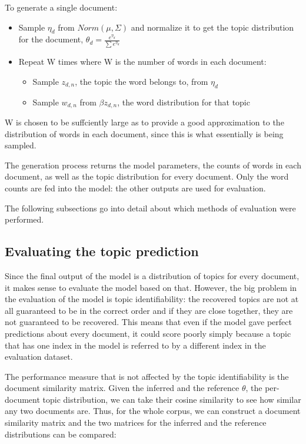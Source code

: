 \documentclass[12pt,a4paper,twoside,openright]{report}
\begin{document}
To generate a single document:

\begin{itemize}[noitemsep]
\item Sample $\eta_d$ from $Norm(\mu, \Sigma)$ and normalize it to get the topic distribution for the document, $\theta_d = \frac{e^{\eta_d}}{\sum{e^{\eta_d}}}$
\item Repeat W times where W is the number of words in each document:
\begin{itemize}[noitemsep]
\item Sample $z_{d, n}$, the topic the word belongs to, from $\eta_d$
\item Sample $w_{d, n}$ from $\beta{z_{d, n}}$, the word distribution for that topic
\end{itemize}
\end{itemize}

W is chosen to be suffciently large as to provide a good approximation to the distribution of words in each document, since this is what essentially is being sampled.

The generation process returns the model parameters, the counts of words in each document, as well as the topic distribution for every document. Only the word counts are fed into the model: the other outputs are used for evaluation.

The following subsections go into detail about which methods of evaluation were performed.

\subsection{Evaluating the topic prediction}

Since the final output of the model is a distribution of topics for every document, it makes sense to evaluate the model based on that. However, the big problem in the evaluation of the model is topic identifiability: the recovered topics are not at all guaranteed to be in the correct order and if they are close together, they are not guaranteed to be recovered. This means that even if the model gave perfect predictions about every document, it could score poorly simply because a topic that has one index in the model is referred to by a different index in the evaluation dataset.

The performance measure that is not affected by the topic identifiability is the document similarity matrix. Given the inferred and the reference $\theta$, the per-document topic distribution, we can take their cosine similarity to see how similar any two documents are. Thus, for the whole corpus, we can construct a document similarity matrix and the two matrices for the inferred and the reference distributions can be compared:
\end{document}
